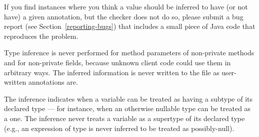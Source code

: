 If you find instances where you think a value should be inferred to have
(or not have) a
given annotation, but the checker does not do so, please submit a bug
report (see Section~\ref{reporting-bugs}) that includes a small piece of
Java code that reproduces the problem.

%
%



Type inference is never performed for method parameters of non-private
methods and for non-private fields, because unknown client code could use
them in arbitrary ways.  The inferred information is never written to the
 file as user-written annotations are.

The inference indicates when a variable can be treated as having a subtype
of its declared type --- for instance, when an otherwise nullable type can be
treated as a  one.  The inference never treats a variable as
a supertype of its declared type (e.g., an expression of 
type is never inferred to be treated as possibly-null).

